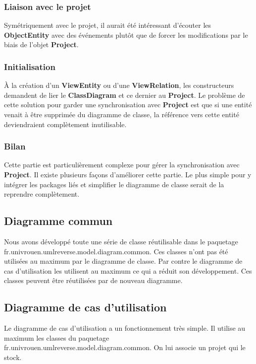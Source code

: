 \documentclass[hidelinks, 10pt,a4paper]{article}
\begin{document}
  \subsubsection{Liaison avec le projet}
  Symétriquement avec le projet, il aurait été intéressant d'écouter les \textbf{ObjectEntity} avec des événements
  plutôt que de forcer les modifications par le biais de l'objet \textbf{Project}. 
  
  \subsubsection{Initialisation}
  À la création d'un \textbf{ViewEntity} ou d'une \textbf{ViewRelation}, les constructeurs demandent de lier le \textbf{ClassDiagram} et ce dernier au \textbf{Project}.
  Le problème de cette solution pour garder une synchronisation avec \textbf{Project} est que si une entité venait 
  à être supprimée du diagramme de classe, 
  la référence vers cette entité deviendraient complètement inutilisable. 
  
  \subsubsection{Bilan}
  Cette partie est particulièrement complexe pour gérer la synchronisation avec \textbf{Project}. Il existe plusieurs façons d'améliorer cette partie.
  Le plus simple pour y intégrer les packages liés et simplifier le diagramme de classe serait de la reprendre complètement. 
  
  \subsection{Diagramme commun}
    Nous avons développé toute une série de classe réutilisable dans le paquetage \newline 
    fr.univrouen.umlreverse.model.diagram.common.
    Ces classes n'ont pas été utilisées au maximum par le diagramme de classe. Par contre le diagramme de cas d'utilisation les utilisent
    au maximum ce qui a réduit son développement. Ces classes peuvent être réutilisées par de nouveau diagramme.
    
  \subsection{Diagramme de cas d'utilisation}
    Le diagramme de cas d'utilisation a un fonctionnement très simple. Il utilise au maximum les classes du paquetage 
    fr.univrouen.umlreverse.model.diagram.common. On lui associe un projet qui le stock.
  
\end{document}

